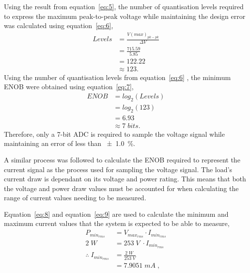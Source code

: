 Using the result from equation~\ref{eq:5}, the number of quantisation levels required to express the maximum peak-to-peak voltage while maintaining the design error was calculated using equation~\ref{eq:6},
\begin{equation}
\label{eq:6}
\begin{split}
    Levels  &= \frac{V(max)_{pk-pk}}{\Delta V} \\
            &= \frac{715.59}{5.85} \\
            &= 122.22\\
            &\approx 123.
\end{split}
\end{equation}
Using the number of quantisation levels from equation~\ref{eq:6} , the minimum ENOB were obtained using equation~\ref{eq:7},
\begin{equation}
\label{eq:7}
\begin{split}
    ENOB    &= log_{2}(Levels) \\
            &= log_{2}(123) \\
            &= 6.93\\
            &\approx 7\; bits.
\end{split}
\end{equation}
Therefore, only a 7-bit ADC is required to sample the voltage signal while maintaining an error of less than \qty{\pm 1.0}{\percent}.
\par
A similar process was followed to calculate the ENOB required to represent the current signal as the process used for sampling the voltage signal. The load's current draw is dependant on its voltage and power rating. This means that both the voltage and power draw values must be accounted for when calculating the range of current values needing to be measured.
\par
Equation~\ref{eq:8} and equation~\ref{eq:9} are used to calculate the minimum and maximum current values that the system is expected to be able to measure,
\begin{equation}
\label{eq:8}
\begin{split}
    P_{min_{rms}}                   &= V_{max_{rms}} \cdot I_{min_{rms}} \\
    2 \; W \;                       &= 253 \; V \; \cdot I_{min_{rms}} \\
    \therefore \; I_{min_{rms}}     &= \frac{2 \; W \;}{253 \; V} \\
                                    &= 7.9051 \; mA \; ,\\
\end{split}
\end{equation}

